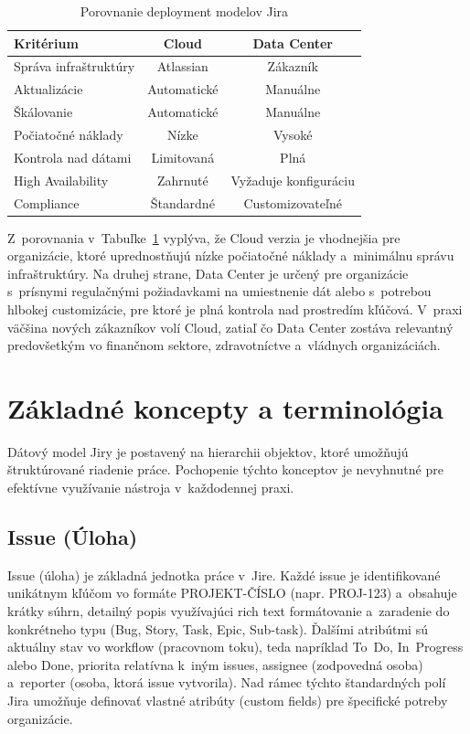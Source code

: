 \begin{table}[ht]
\centering
\caption{Porovnanie deployment modelov Jira}
\label{tab:deployment-comparison}
\begin{tabular}{|l|c|c|}
\hline
\textbf{Kritérium} & \textbf{Cloud} & \textbf{Data Center} \\
\hline
Správa infraštruktúry & Atlassian & Zákazník \\
Aktualizácie & Automatické & Manuálne \\
Škálovanie & Automatické & Manuálne \\
Počiatočné náklady & Nízke & Vysoké \\
Kontrola nad dátami & Limitovaná & Plná \\
High Availability & Zahrnuté & Vyžaduje konfiguráciu \\
Compliance & Štandardné & Customizovateľné \\
\hline
\end{tabular}
\end{table}

Z~porovnania v~Tabuľke~\ref{tab:deployment-comparison} vyplýva, že Cloud verzia je vhodnejšia pre organizácie, ktoré uprednostňujú nízke počiatočné náklady a~minimálnu správu infraštruktúry. Na druhej strane, Data Center je určený pre organizácie s~prísnymi regulačnými požiadavkami na umiestnenie dát alebo s~potrebou hlbokej customizácie, pre ktoré je plná kontrola nad prostredím kľúčová. V~praxi väčšina nových zákazníkov volí Cloud, zatiaľ čo Data Center zostáva relevantný predovšetkým vo finančnom sektore, zdravotníctve a~vládnych organizáciách.

\section{Základné koncepty a terminológia}

Dátový model Jiry je postavený na hierarchii objektov, ktoré umožňujú štruktúrované riadenie práce. Pochopenie týchto konceptov je nevyhnutné pre efektívne využívanie nástroja v~každodennej praxi.

\subsection{Issue (Úloha)}

Issue (úloha) je základná jednotka práce v~Jire. Každé issue je identifikované unikátnym kľúčom vo formáte PROJEKT-ČÍSLO (napr. PROJ-123) a~obsahuje krátky súhrn, detailný popis využívajúci rich text formátovanie a~zaradenie do konkrétneho typu (Bug, Story, Task, Epic, Sub-task). Ďalšími atribútmi sú aktuálny stav vo workflow (pracovnom toku), teda napríklad To~Do, In~Progress alebo Done, priorita relatívna k~iným issues, assignee (zodpovedná osoba) a~reporter (osoba, ktorá issue vytvorila). Nad rámec týchto štandardných polí Jira umožňuje definovať vlastné atribúty (custom fields) pre špecifické potreby organizácie.

